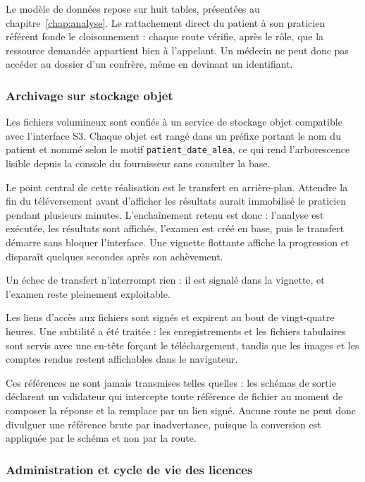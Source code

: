 Le modèle de données repose sur huit tables, présentées au chapitre~\ref{chap:analyse}. Le
rattachement direct du patient à son praticien référent fonde le cloisonnement : chaque route
vérifie, après le rôle, que la ressource demandée appartient bien à l'appelant. Un médecin ne
peut donc pas accéder au dossier d'un confrère, même en devinant un identifiant.

\subsubsection{Archivage sur stockage objet}

Les fichiers volumineux sont confiés à un service de stockage objet compatible avec
l'interface S3. Chaque objet est rangé dans un préfixe portant le nom du patient et nommé
selon le motif \texttt{patient\_date\_alea}, ce qui rend l'arborescence lisible depuis la
console du fournisseur sans consulter la base.

Le point central de cette réalisation est le transfert en arrière-plan. Attendre
la fin du téléversement avant d'afficher les résultats aurait immobilisé le praticien pendant
plusieurs minutes. L'enchaînement retenu est donc : l'analyse est exécutée, les résultats sont
affichés, l'examen est créé en base, puis le transfert démarre sans bloquer l'interface. Une
vignette flottante affiche la progression et disparaît quelques secondes après son achèvement.

Un échec de transfert n'interrompt rien : il est signalé dans la vignette, et l'examen reste
pleinement exploitable.

Les liens d'accès aux fichiers sont signés et expirent au bout de vingt-quatre heures.
Une subtilité a été traitée : les enregistrements et les fichiers tabulaires sont servis avec
une en-tête forçant le téléchargement, tandis que les images et les comptes rendus restent
affichables dans le navigateur.

Ces références ne sont jamais transmises telles quelles : les schémas de sortie déclarent un
validateur qui intercepte toute référence de fichier au moment de composer la réponse et la
remplace par un lien signé. Aucune route ne peut donc divulguer une
référence brute par inadvertance, puisque la conversion est appliquée par le schéma et non par
la route.

\subsubsection{Administration et cycle de vie des licences}

